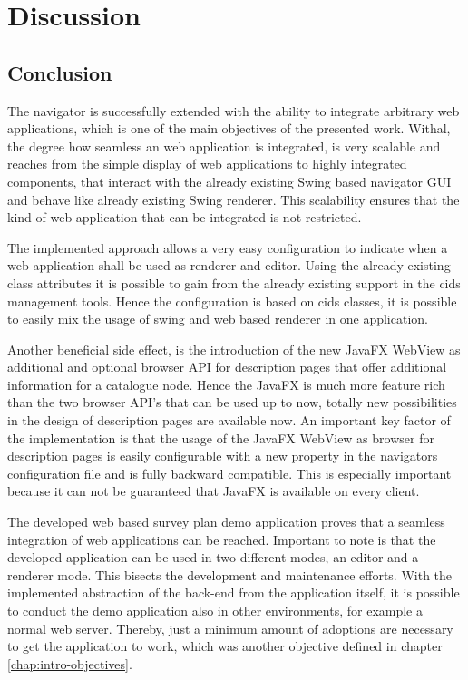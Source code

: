 \chapter{Discussion}

\section{Conclusion}

The navigator is successfully extended with the ability to integrate arbitrary web applications, which is one of the main objectives of the presented work. 
Withal, the degree how seamless an web application is integrated, is very scalable and reaches from the simple display of web applications to highly integrated components, that interact with the already existing Swing based navigator GUI and behave like already existing Swing renderer. 
This scalability ensures that the kind of web application that can be integrated is not restricted.

The implemented approach allows a very easy configuration to indicate when a web application shall be used as renderer and editor. 
Using the already existing class attributes it is possible to gain from the already existing support in the cids management tools. 
Hence the configuration is based on cids classes, it is possible to easily mix the usage of swing and web based renderer in one application.

Another beneficial side effect, is the introduction of the new JavaFX WebView as additional and optional browser API for description pages that offer additional information for a catalogue node.
Hence the JavaFX is much more feature rich than the two browser API's that can be used up to now, totally new possibilities in the design of description pages are available now. 
An important key factor of the implementation is that the usage of the JavaFX WebView as browser for description pages is easily configurable with a new property in the navigators configuration file and is fully backward compatible. 
This is especially important because it can not be guaranteed that JavaFX is available on every client.

The developed web based survey plan demo application proves that a seamless integration of web applications can be reached. 
Important to note is that the developed application can be used in two different modes, an editor and a renderer mode. 
This bisects the development and maintenance efforts.
With the implemented abstraction of the back-end from the application itself, it is possible to conduct the demo application also in other environments, for example a normal web server. Thereby, just a minimum amount of adoptions are necessary to get the application to work, which was another objective defined in chapter \ref{chap:intro-objectives}.

